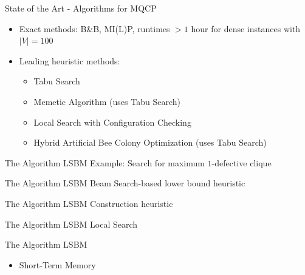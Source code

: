 \documentclass{beamer}
\begin{document}
\begin{frame}{State of the Art - Algorithms for MQCP}
    \begin{itemize}
        \item<1-> Exact methods: B\&B, MI(L)P, runtimes $> 1$ hour for dense instances with $|V|=100$
        \item<2-> Leading heuristic methods:
        \begin{itemize}
            \item<3-> Tabu Search \cite{djeddi_extension_2019}
            \item<4-> Memetic Algorithm (uses Tabu Search) \cite{zhou_opposition-based_2020}
            \item<5-> Local Search with Configuration Checking \cite{chen_nuqclq_2021}
            \item<6-> Hybrid Artificial Bee Colony Optimization (uses Tabu Search) \cite{peng_solving_2021}
        \end{itemize}
    \end{itemize}
\end{frame}

\begin{frame}{The Algorithm LSBM}
    Example: Search for maximum $1$-defective clique
\end{frame}

\begin{frame}{The Algorithm LSBM}
    Beam Search-based lower bound heuristic

\end{frame}

\begin{frame}{The Algorithm LSBM}
    Construction heuristic
     
\end{frame}

\begin{frame}{The Algorithm LSBM}
    Local Search

\end{frame}

\begin{frame}{The Algorithm LSBM}
    \begin{itemize}
        \item Short-Term Memory
    \end{itemize}

\end{frame}
\end{document}
